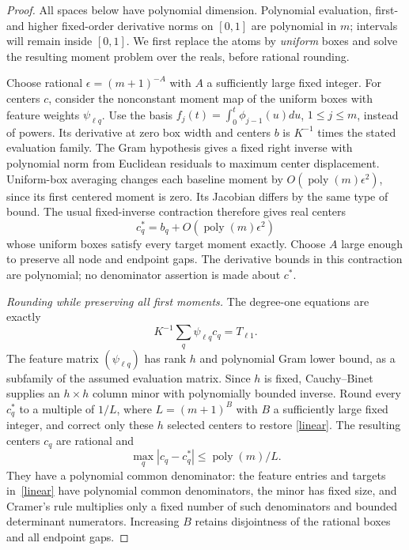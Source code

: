 \documentclass[11pt]{article}
\begin{document}
\begin{proof}
All spaces below have polynomial dimension. Polynomial evaluation,
first- and higher fixed-order derivative norms on $[0,1]$ are
polynomial in $m$; intervals will remain inside $[0,1]$.
We first replace the atoms by \emph{uniform} boxes and solve the
resulting moment problem over the reals, before rational rounding.

Choose rational $\epsilon=(m+1)^{-A}$ with $A$ a sufficiently large
fixed integer. For centers $c$, consider the nonconstant moment map
of the uniform boxes with feature weights $\psi_{\ell q}$.
Use the basis $f_j(t)=\int_0^t\phi_{j-1}(u)du$, $1\le j\le m$,
instead of powers. Its derivative at zero box width and centers $b$
is $K^{-1}$ times the stated evaluation family. The Gram hypothesis
gives a fixed right inverse with polynomial norm from Euclidean
residuals to maximum center displacement.
Uniform-box averaging changes each baseline moment by
$O(\operatorname{poly}(m)\epsilon^2)$, since its first centered
moment is zero. Its Jacobian differs by the same type of bound.
The usual fixed-inverse contraction therefore gives real centers
\[
 c_q^*=b_q+O(\operatorname{poly}(m)\epsilon^2)
\]
whose uniform boxes satisfy every target moment exactly. Choose $A$
large enough to preserve all node and endpoint gaps. The derivative
bounds in this contraction are polynomial; no denominator assertion
is made about $c^*$.

\medskip\noindent\emph{Rounding while preserving all first moments.}
The degree-one equations are exactly
\begin{equation}\label{linear}
 K^{-1}\sum_q\psi_{\ell q}c_q=T_{\ell1}.
\end{equation}
The feature matrix $(\psi_{\ell q})$ has rank $h$ and polynomial
Gram lower bound, as a subfamily of the assumed evaluation matrix.
Since $h$ is fixed, Cauchy--Binet supplies an $h\times h$ column
minor with polynomially bounded inverse. Round every $c_q^*$ to a
multiple of $1/L$, where $L=(m+1)^B$ with $B$ a sufficiently large
fixed integer, and correct only these $h$ selected centers to restore
\eqref{linear}. The resulting centers $c_q$ are rational and
\[
 \max_q|c_q-c_q^*|\le\operatorname{poly}(m)/L.
\]
They have a polynomial common denominator: the feature entries and
targets in~\eqref{linear} have polynomial common denominators, the
minor has fixed size, and Cramer's rule multiplies only a fixed number
of such denominators and bounded determinant numerators. Increasing
$B$ retains disjointness of the rational boxes and all endpoint gaps.


\end{proof}
\end{document}
